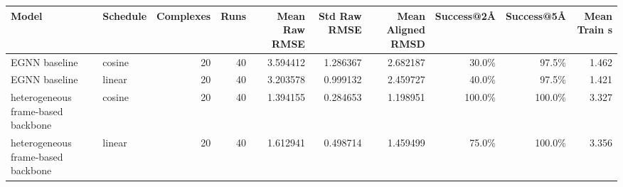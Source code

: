 \begin{tabular}{llrrrrrrrr}
\toprule
Model & Schedule & Complexes & Runs & Mean Raw RMSE & Std Raw RMSE & Mean Aligned RMSD & Success@2\AA{} & Success@5\AA{} & Mean Train s \\
\midrule
EGNN baseline & cosine & 20 & 40 & 3.594412 & 1.286367 & 2.682187 & 30.0\% & 97.5\% & 1.462 \\
EGNN baseline & linear & 20 & 40 & 3.203578 & 0.999132 & 2.459727 & 40.0\% & 97.5\% & 1.421 \\
heterogeneous frame-based backbone & cosine & 20 & 40 & 1.394155 & 0.284653 & 1.198951 & 100.0\% & 100.0\% & 3.327 \\
heterogeneous frame-based backbone & linear & 20 & 40 & 1.612941 & 0.498714 & 1.459499 & 75.0\% & 100.0\% & 3.356 \\
\bottomrule
\end{tabular}
